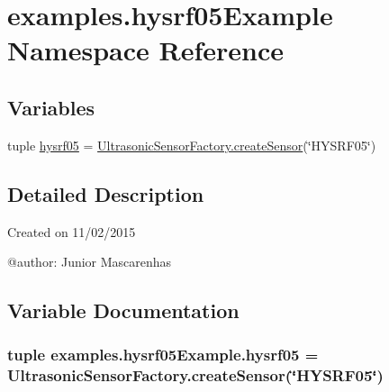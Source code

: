 \hypertarget{namespaceexamples_1_1hysrf05Example}{}\section{examples.\+hysrf05\+Example Namespace Reference}
\label{namespaceexamples_1_1hysrf05Example}
\subsection*{Variables}
\begin{DoxyCompactItemize}
\item 
tuple \hyperlink{namespaceexamples_1_1hysrf05Example_a5521137994b201fb266067bebb975ea7}{hysrf05} = \hyperlink{classconcretefactory_1_1ultrasonicSensorFactory_1_1UltrasonicSensorFactory_ade21ba1ce348eb9e5cf8eee3fda4a773}{Ultrasonic\+Sensor\+Factory.\+create\+Sensor}(\char`\"{}H\+Y\+S\+R\+F05\char`\"{})
\end{DoxyCompactItemize}


\subsection{Detailed Description}
\begin{DoxyVerb}Created on 11/02/2015

@author: Junior Mascarenhas
\end{DoxyVerb}
 

\subsection{Variable Documentation}
\hypertarget{namespaceexamples_1_1hysrf05Example_a5521137994b201fb266067bebb975ea7}{}
\subsubsection[{hysrf05}]{\setlength{\rightskip}{0pt plus 5cm}tuple examples.\+hysrf05\+Example.\+hysrf05 = {\bf Ultrasonic\+Sensor\+Factory.\+create\+Sensor}(\char`\"{}H\+Y\+S\+R\+F05\char`\"{})}\label{namespaceexamples_1_1hysrf05Example_a5521137994b201fb266067bebb975ea7}

